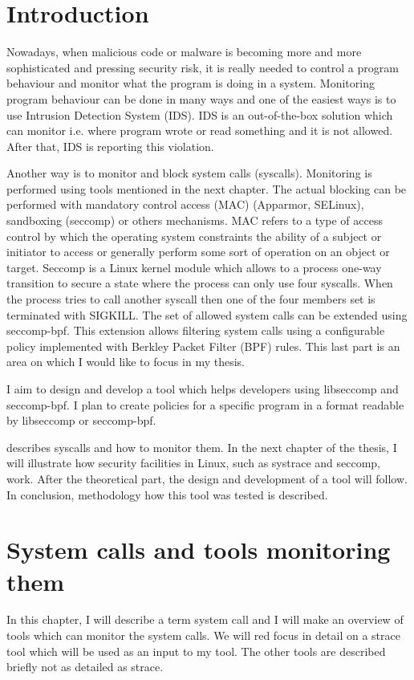 
\chapter{Introduction}
Nowadays, when malicious code or malware is becoming more and more sophisticated and pressing security risk, it is really needed to control a program behaviour and monitor what the program is doing in a system.
Monitoring program behaviour can be done in many ways and one of the easiest ways is to use Intrusion Detection System (IDS).
IDS is an out-of-the-box solution which can monitor i.e. where program wrote or read something and it is not allowed.
After that, IDS is reporting this violation. %

Another way is to monitor and block system calls (syscalls).
Monitoring is performed using tools mentioned in the next chapter.
The actual blocking can be performed with mandatory control access (MAC) (Apparmor, SELinux), sandboxing (seccomp) or others mechanisms.
MAC refers to a type of access control by which the operating system constraints the ability of a subject or initiator to access or generally perform some sort of operation on an object or target.
Seccomp is a Linux kernel module which allows to a process one-way transition to secure a state where the process can only use four syscalls.
When the process tries to call another syscall then one of the four members set is terminated with SIGKILL.
The set of allowed system calls can be extended using seccomp-bpf.
This extension allows filtering system calls using a configurable policy implemented with Berkley Packet Filter (BPF) rules.
This last part is an area on which I would like to focus in my thesis.

I aim to design and develop a tool which helps developers using libseccomp and seccomp-bpf.
I plan to create policies for a specific program in a format readable by libseccomp or seccomp-bpf.

 describes syscalls and how to monitor them.
In the next chapter of the thesis, I will illustrate how security facilities in Linux, such as systrace and seccomp, work.
After the theoretical part, the design and development of a tool will follow.
In conclusion, methodology how this tool was tested is described.


\chapter{System calls and tools monitoring them}
\label{chap:syscalls}
In this chapter, I will describe a term system call and I will make an overview of tools which can monitor the system calls.
We will red focus in detail on a strace tool which will be used as an input to my tool.
The other tools are described briefly not as detailed as strace.

